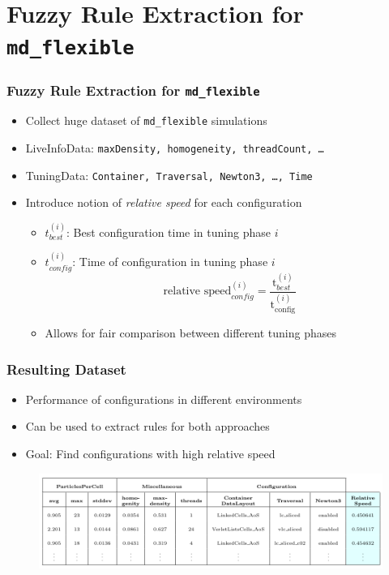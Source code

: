 \documentclass[
	10pt,
	t		%
]{beamer}
\begin{document}
\section{Fuzzy Rule Extraction for \texttt{md\_flexible}}
\begin{frame}
	\frametitle{Fuzzy Rule Extraction for \texttt{md\_flexible}}

	\begin{itemize}
		\item Collect huge dataset of \texttt{md\_flexible} simulations
		\item LiveInfoData: {\small \texttt{maxDensity, homogeneity, threadCount, \dots} }
		\item TuningData: {\small \texttt{Container, Traversal, Newton3, \dots, Time} }
		\item Introduce notion of \textit{relative speed} for each configuration
		      \begin{itemize}
			      \item $t_{best}^{(i)}$: Best configuration time in tuning phase $i$
			      \item $t_{config}^{(i)}$: Time of configuration in tuning phase $i$
			            \[ \text{relative speed}_{config}^{(i)} = \frac{\text{t}_{best}^{(i)}}{\text{t}_{\text{config}}^{(i)}} \]
			      \item Allows for fair comparison between different tuning phases
		      \end{itemize}
	\end{itemize}

\end{frame}

\begin{frame}
	\frametitle{Resulting Dataset}

	\begin{itemize}
		\item Performance of configurations in different environments
		\item Can be used to extract rules for both approaches
		\item Goal: Find configurations with high relative speed
	\end{itemize}

	\begin{figure}
		\centering
		\includegraphics[width=1\textwidth]{figures/relative-speed-table.png}
	\end{figure}

\end{frame}
\end{document}
